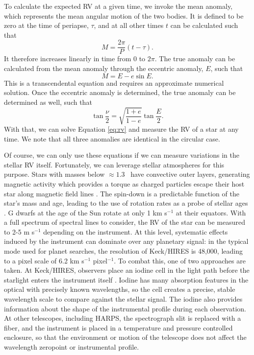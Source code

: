 To calculate the expected RV at a given time, we invoke the mean anomaly, which represents the mean angular motion of the 
two bodies. 
It is defined to be zero at the time of periapse, $\tau$, and at all other times $t$ can 
be calculated such that
\begin{equation}
M = \frac{2\pi}{P}(t-\tau).
\end{equation}
It therefore increases linearly in time from 0 to $2\pi$.
The true anomaly can be calculated from the mean anomaly through the eccentric anomaly, 
$E$, such that
\begin{equation}
M = E - e \sin E.
\end{equation}
This is a transcendental equation and requires an approximate numerical solution.
Once the eccentric anomaly is determined, the true anomaly can be determined as well,
such that
\begin{equation}
\tan \frac{\nu}{2} = \sqrt{\frac{1+e}{1-e}} \tan \frac{E}{2}.
\end{equation}
With that, we can solve Equation \ref{eq:rv} and measure the RV of a star at any time.
We note that all three anomalies are identical in the circular case.

Of course, we can only use these equations if we can measure variations in the stellar RV
itself.
Fortunately, we can leverage stellar atmospheres for this purpose.
Stars with masses below $\approx 1.3$ \msun\ have convective outer layers, generating
magnetic activity which provides a torque as charged particles escape their 
host star along magnetic
field lines \citep{Shu94}.
The spin-down is a predictable function of the star's mass and age, leading to the use
of rotation rates as a probe of stellar ages \citep{Barnes03}.
G dwarfs at the age of the Sun rotate at only 1 km s$^{-1}$ at their equators.
With a full spectrum of spectral lines to consider, the RV of the star can be 
measured to 2-5 m s$^{-1}$ depending on the instrument.
At this level, systematic effects induced by the instrument can dominate over any planetary
signal: in the typical mode used for planet searches,
the resolution of Keck/HIRES is 48,000, leading to a pixel scale of 6.2 km s$^{-1}$ pixel$^{-1}$.
To combat this, one of two approaches are taken.
At Keck/HIRES, observers place an iodine cell in the light path before the starlight
enters the instrument itself \citep{Butler96}.
Iodine has many absorption features in the optical with precisely known wavelengths,
so the cell creates a precise, stable wavelength scale to compare against the stellar
signal. 
The iodine also provides information about the shape of the instrumental profile during
each observation.
At other telescopes, including HARPS, the spectrograph slit is replaced with a fiber,
and the instrument is placed in a temperature and pressure controlled enclosure, so that
the environment or motion of the telescope does not affect the wavelength zeropoint or
instrumental profile.


